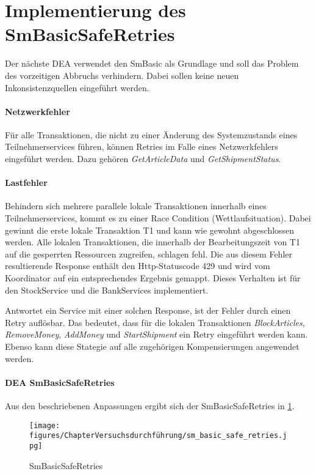 \section{Implementierung des SmBasicSafeRetries}

Der nächste DEA verwendet den SmBasic als Grundlage und soll das Problem des vorzeitigen Abbruchs verhindern. Dabei sollen keine neuen Inkonsistenzquellen eingeführt werden. 

\paragraph*{Netzwerkfehler}
Für alle Transaktionen, die nicht zu einer Änderung des Systemzustands eines Teilnehmerservices führen, können Retries im Falle eines Netzwerkfehlers eingeführt werden. Dazu gehören \textit{GetArticleData} und \textit{GetShipmentStatus}. 

\paragraph*{Lastfehler}
Behindern sich mehrere parallele lokale Transaktionen innerhalb eines Teilnehmerservices, kommt es zu einer Race Condition (Wettlaufsituation). Dabei gewinnt die erste lokale Transaktion T1 und kann wie gewohnt abgeschlossen werden. Alle lokalen Transaktionen, die innerhalb der Bearbeitungszeit von T1 auf die gesperrten Ressourcen zugreifen, schlagen fehl. Die aus diesem Fehler resultierende Response enthält den Http-Statuscode 429 und wird vom Koordinator auf ein entsprechendes Ergebnis gemappt. Dieses Verhalten ist für den StockService und die BankServices implementiert. 

Antwortet ein Service mit einer solchen Response, ist der Fehler durch einen Retry auflösbar. Das bedeutet, dass für die lokalen Transaktionen \textit{BlockArticles}, \textit{RemoveMoney}, \textit{AddMoney} und \textit{StartShipment} ein Retry eingeführt werden kann. Ebenso kann diese Stategie auf alle zugehörigen Kompensierungen angewendet werden.

\paragraph*{DEA SmBasicSafeRetries}
Aus den beschriebenen Anpassungen ergibt sich der SmBasicSafeRetries in \cref{fig:SmBasicSafeRetries}. 

\begin{figure}[h!]
	\centering
	\texttt{[image: figures/ChapterVersuchsdurchführung/sm\_basic\_safe\_retries.jpg]}
	\caption{SmBasicSafeRetries}
	\label{fig:SmBasicSafeRetries}
\end{figure}
\FloatBarrier

